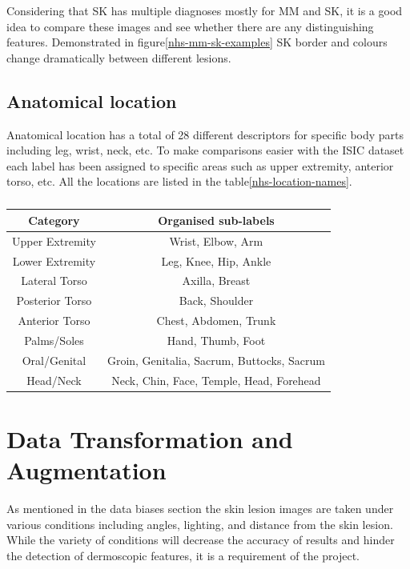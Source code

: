 Considering that SK has multiple diagnoses mostly for MM and SK, it is a good idea to compare these images and see whether there are any distinguishing features. Demonstrated in figure\ref{nhs-mm-sk-examples} SK border and colours change dramatically between different lesions.

\subsection{Anatomical location}

Anatomical location has a total of 28 different descriptors for specific body parts including leg, wrist, neck, etc. To make comparisons easier with the ISIC dataset each label has been assigned to specific areas such as upper extremity, anterior torso, etc. All the locations are listed in the table\ref{nhs-location-names}. 


\begin{table}
    \centering
    \begin{tabular}{|c|c|}
        Category & Organised sub-labels
        \\
        \hline
        Upper Extremity & Wrist, Elbow, Arm
        \\
        \hline
        Lower Extremity & Leg, Knee, Hip, Ankle
        \\
        \hline
        Lateral Torso & Axilla, Breast
        \\
        \hline
        Posterior Torso & Back, Shoulder
        \\
        \hline
        Anterior Torso & Chest, Abdomen, Trunk
        \\
        \hline
        Palms/Soles & Hand, Thumb, Foot
        \\
        \hline
        Oral/Genital & Groin, Genitalia, Sacrum, Buttocks, Sacrum
        \\
        \hline
        Head/Neck & Neck, Chin, Face, Temple, Head, Forehead
        \\
        \hline
    \end{tabular}
    \caption{}
\end{table}\label{nhs-location-names}



\section{Data Transformation and Augmentation}
As mentioned in the data biases section the skin lesion images are taken under various conditions including angles, lighting, and distance from the skin lesion. While the variety of conditions will decrease the accuracy of results and hinder the detection of dermoscopic features, it is a requirement of the project.

